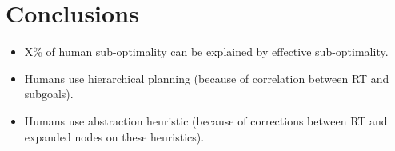 \documentclass[10pt,letterpaper]{article}
\begin{document}
\section{Conclusions}

\begin{itemize}
	\item X\% of human sub-optimality can be explained by effective sub-optimality. 
	\item Humans use hierarchical planning (because of correlation between RT and subgoals).
	\item Humans use abstraction heuristic (because of corrections between RT and expanded nodes on these heuristics).
\end{itemize}



\end{document}
